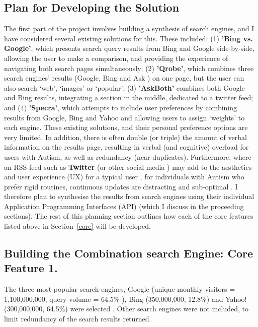 \documentclass[a4paper, 11pt]{article}
\begin{document}
\begin{justify}
\section{Plan for Developing the Solution}\label{sol}
The first part of the project involves building a synthesis of search engines, and I have considered several existing solutions for this. These included: (1) \textbf{'Bing vs. Google'}\cite{bingvsgoogle}, which presents search query results from Bing \cite{bing} and Google \cite{google} side-by-side, allowing the user to make a comparison, and providing the experience of navigating both search pages simultaneously; (2) \textbf{'Qrobe'}\cite{qrobe}, which combines three search engines’ results (Google, Bing and Ask \cite{ask}) on one page, but the user can also search ‘web’, ‘images’ or ‘popular’; (3) \textbf{'AskBoth'}\cite{askboth} combines both Google and Bing results, integrating a section in the middle, dedicated to a twitter feed; and (4) \textbf{'Specra'}\cite{specra}, which attempts to include user preferences by combining results from Google, Bing and Yahoo \cite{yahoo} and allowing users to assign `weights' to each engine. These existing solutions, and their personal preference options are very limited. In addition, there is often double (or triple) the amount of verbal information on the results page, resulting in verbal (and cognitive) overload for users with Autism, as well as redundancy (near-duplicates). Furthermore, where an RSS-feed such as \textbf{Twitter} (or other social media \cite{twitter}) may add to the aesthetics and user experience (UX) for a typical user \cite{social}, for individuals with Autism who prefer rigid routines, continuous updates are distracting and sub-optimal \cite{disengagement}. I therefore plan to synthesise the results from search engines using their individual Application Programming Interfaces (API) (which I discuss in the proceeding sections). The rest of this planning section outlines how each of the core features listed above in Section~\ref{core} will be developed.

\subsection{Building the Combination search Engine: Core Feature 1.} 
The three most popular search engines, Google (unique monthly visitors = 1,100,000,000, query volume = 64.5\% ), Bing (350,000,000, 12.8\%) and Yahoo! (300,000,000, 64.5\%) were selected \cite{ebiz, adam}. Other search engines were not included, to limit redundancy of the search results returned.


\end{justify}
\end{document}
